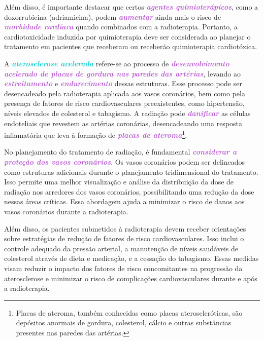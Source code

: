 \documentclass[11pt,a4paper]{article}
\begin{document}
	Além disso, é importante destacar que certos \textcolor{MediumOrchid}{\textbf{\textit{agentes quimioterápicos}}}, como a doxorrubicina (adriamicina), podem \textcolor{MediumOrchid}{\textbf{\textit{aumentar}}} ainda mais o risco de \textcolor{MediumOrchid}{\textbf{\textit{morbidade cardíaca}}} quando combinados com a radioterapia. Portanto, a cardiotoxicidade induzida por quimioterapia deve ser considerada ao planejar o tratamento em pacientes que receberam ou receberão quimioterapia cardiotóxica.

	A \textcolor{DarkTurquoise}{\textbf{\textit{aterosclerose acelerada}}} refere-se ao processo de \textcolor{MediumOrchid}{\textbf{\textit{desenvolvimento acelerado de placas de gordura nas paredes das artérias}}}, levando ao \textcolor{MediumOrchid}{\textbf{\textit{estreitamento}}} e \textcolor{MediumOrchid}{\textbf{\textit{endurecimento}}} dessas estruturas. Esse processo pode ser desencadeado pela radioterapia aplicada aos vasos coronários, bem como pela presença de fatores de risco cardiovasculares preexistentes, como hipertensão, níveis elevados de colesterol e tabagismo. A radiação pode \textcolor{MediumOrchid}{\textbf{\textit{danificar}}} as células endoteliais que revestem as artérias coronárias, desencadeando uma resposta inflamatória que leva à formação de \textcolor{MediumOrchid}{\textbf{\textit{placas de ateroma}}}\footnote{Placas de ateroma, também conhecidas como placas ateroscleróticas, são depósitos anormais de gordura, colesterol, cálcio e outras substâncias presentes nas paredes das artérias.}.

	No planejamento do tratamento de radiação, é fundamental \textcolor{MediumOrchid}{\textbf{\textit{considerar a proteção dos vasos coronários}}}. Os vasos coronários podem ser delineados como estruturas adicionais durante o planejamento tridimensional do tratamento. Isso permite uma melhor visualização e análise da distribuição da dose de radiação nos arredores dos vasos coronários, possibilitando uma redução da dose nessas áreas críticas. Essa abordagem ajuda a minimizar o risco de danos aos vasos coronários durante a radioterapia.

	Além disso, os pacientes submetidos à radioterapia devem receber orientações sobre estratégias de redução de fatores de risco cardiovasculares. Isso inclui o controle adequado da pressão arterial, a manutenção de níveis saudáveis de colesterol através de dieta e medicação, e a cessação do tabagismo. Essas medidas visam reduzir o impacto dos fatores de risco concomitantes na progressão da aterosclerose e minimizar o risco de complicações cardiovasculares durante e após a radioterapia.
\end{document}
